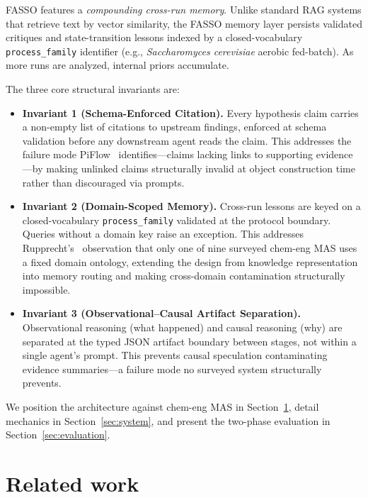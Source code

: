 \documentclass[11pt]{article}
\begin{document}
FASSO features a \emph{compounding cross-run memory}. Unlike standard RAG systems that retrieve text by vector similarity, the FASSO memory layer persists validated critiques and state-transition lessons indexed by a closed-vocabulary \texttt{process\_family} identifier (e.g., \emph{Saccharomyces cerevisiae} aerobic fed-batch). As more runs are analyzed, internal priors accumulate.

The three core structural invariants are:
\begin{itemize}[leftmargin=*, noitemsep]
    \item \textbf{Invariant 1 (Schema-Enforced Citation).} Every hypothesis claim carries a non-empty list of citations to upstream findings, enforced at schema validation before any downstream agent reads the claim. This addresses the failure mode PiFlow~\citep{piflow} identifies—claims lacking links to supporting evidence—by making unlinked claims structurally invalid at object construction time rather than discouraged via prompts.
    \item \textbf{Invariant 2 (Domain-Scoped Memory).} Cross-run lessons are keyed on a closed-vocabulary \texttt{process\_family} validated at the protocol boundary. Queries without a domain key raise an exception. This addresses Rupprecht's~\citep{rupprecht2026} observation that only one of nine surveyed chem-eng MAS uses a fixed domain ontology, extending the design from knowledge representation into memory routing and making cross-domain contamination structurally impossible.
    \item \textbf{Invariant 3 (Observational--Causal Artifact Separation).} Observational reasoning (what happened) and causal reasoning (why) are separated at the typed JSON artifact boundary between stages, not within a single agent's prompt. This prevents causal speculation contaminating evidence summaries—a failure mode no surveyed system structurally prevents.
\end{itemize}

We position the architecture against chem-eng MAS in Section~\ref{sec:related}, detail mechanics in Section~\ref{sec:system}, and present the two-phase evaluation in Section~\ref{sec:evaluation}.

\section{Related work}
\label{sec:related}
\end{document}
